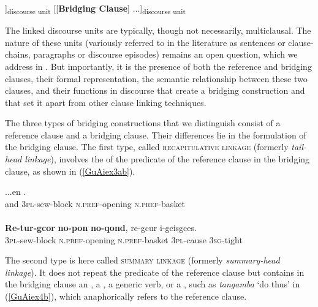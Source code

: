 \documentclass[output=paper]{LSP/langsci}
\begin{document}
\begin{exe}
\ex	\label{GuAiex2}
\glt  
[ ... [\underline{Reference Clause}]]\textsubscript{discourse unit} [[\textbf{Bridging Clause}] ...]\textsubscript{discourse unit} \\
\end{exe}

The linked discourse units are typically, though not necessarily, multiclausal. The nature of these units (variously referred to in the literature as sentences or clause-chains, paragraphs or discourse episodes) remains an open question, which we address in . But importantly, it is the presence of both the reference and bridging clauses, their formal representation, the semantic relationship between these two clauses, and their functions in discourse that create a bridging construction and that set it apart from other clause linking techniques.

The three types of bridging constructions that we distinguish consist of a reference clause and a bridging clause. Their differences lie in the formulation of the bridging clause. The first type, called \textsc{recapitulative linkage} (formerly \textit{tail-head linkage}), involves the  of the predicate of the reference clause in the bridging clause, as shown in (\ref{GuAiex3ab}). 

\begin{exe}
	\ex	\label{GuAiex3ab}
\begin{xlist}
\ex	\label{GuAiex3a}
\gll		...en   \underline{}     \underline{}     \underline{}.\\
			and   \textsc{3pl}-sew-block   \textsc{n.pref}-opening   \textsc{n.pref}-basket\\
		\glt	{} \\
		\ex	\label{GuAiex3b}
\gll		\textbf{Re-tur-gcor }    \textbf{no-pon}     \textbf{no-qond},   re-gcur   i-gcisgces.\\
\textsc{3pl}-sew-block   \textsc{n.pref}-opening   \textsc{n.pref}-basket   \textsc{3pl}-cause   \textsc{3sg}-tight \\
		\glt	{} 
		\end{xlist}
\end{exe}


The second type is here called \textsc{summary linkage} (formerly \textit{summary-head linkage}). It does not repeat the predicate of the reference clause but contains in the bridging clause an , a , a generic verb, or a , such as \textit{tangamba} `do thus' in (\ref{GuAiex4b}), which anaphorically refers to the reference clause. 
\end{document}
